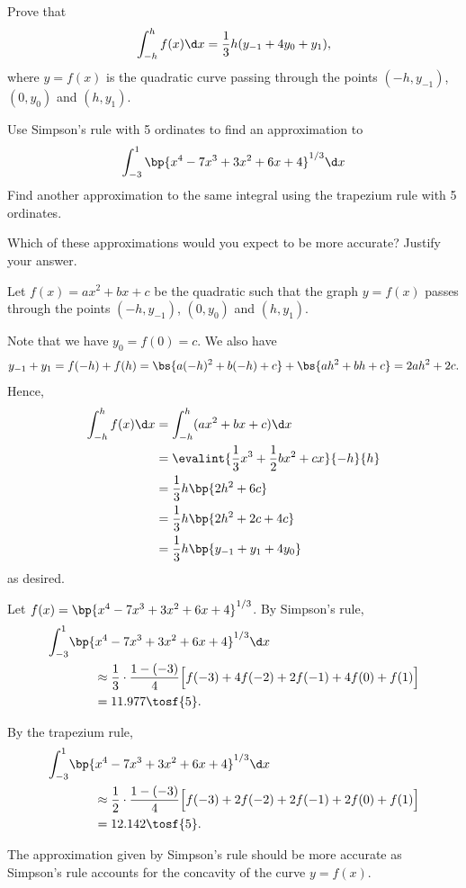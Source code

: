 \begin{problem}
    Prove that \[\int_{-h}^h f(x) \d x = \frac13 h (y_{-1} + 4y_0 + y_1),\] where $y = f(x)$ is the quadratic curve passing through the points $(-h, y_{-1})$, $(0, y_0)$ and $(h, y_1)$.

    Use Simpson's rule with 5 ordinates to find an approximation to \[\int_{-3}^1 \bp{x^4 - 7x^3 + 3x^2 + 6x + 4}^{1/3} \d x\] Find another approximation to the same integral using the trapezium rule with 5 ordinates.

    Which of these approximations would you expect to be more accurate? Justify your answer.
\end{problem}
\begin{solution}
    Let $f(x) = ax^2 + bx + c$ be the quadratic such that the graph $y = f(x)$ passes through the points $(-h, y_{-1})$, $(0, y_0)$ and $(h, y_1)$.

    Note that we have $y_0 = f(0) = c$. We also have \[y_{-1} + y_1 = f(-h) + f(h) = \bs{a(-h)^2 + b(-h) + c} + \bs{ah^2 + bh + c} = 2ah^2 + 2c.\] Hence,
    \begin{align*}
        \int_{-h}^h f(x) \d x &= \int_{-h}^h (ax^2 + bx + c) \d x\\
        &= \evalint{\frac13 x^3 + \frac12 bx^2 + cx}{-h}{h}\\
        &= \frac13 h \bp{2h^2 + 6c}\\
        &= \frac13 h \bp{2h^2 + 2c + 4c}\\
        &= \frac13 h \bp{y_{-1} + y_1 + 4y_0}\\
    \end{align*}
    as desired.

    Let $f(x) = \bp{x^4 - 7x^3 + 3x^2 + 6x + 4}^{1/3}$. By Simpson's rule,
    \begin{align*}
        \int_{-3}^1 &\bp{x^4 - 7x^3 + 3x^2 + 6x + 4}^{1/3} \d x\\
        &\hspace{2em}\approx \frac13 \cdot \frac{1-(-3)}{4} \Big[f(-3) + 4f(-2) + 2f(-1) + 4f(0) + f(1)\Big]\\
        &\hspace{2em}= 11.977 \tosf{5}.
    \end{align*}

    By the trapezium rule,
    \begin{align*}
        \int_{-3}^1 &\bp{x^4 - 7x^3 + 3x^2 + 6x + 4}^{1/3} \d x\\
        &\hspace{2em}\approx \frac12 \cdot \frac{1-(-3)}{4} \Big[f(-3) + 2f(-2) + 2f(-1) + 2f(0) + f(1)\Big]\\
        &\hspace{2em}= 12.142 \tosf{5}.
    \end{align*}

    The approximation given by Simpson's rule should be more accurate as Simpson's rule accounts for the concavity of the curve $y = f(x)$.
\end{solution}

